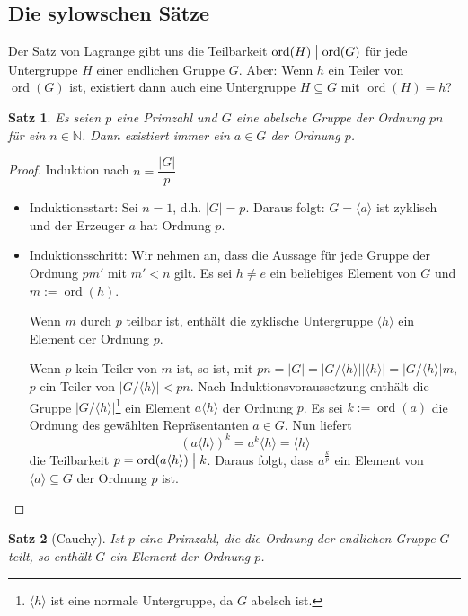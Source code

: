 \documentclass[12pt]{scrartcl} %
\DeclareMathOperator{\ord}{ord}
\newcommand{\divides}{\mathrel{\bigm|}}
\newtheorem{thm}{Satz}[section]
\theoremstyle{definition}
\theoremstyle{remark}
\begin{document}
\subsection{Die sylowschen Sätze}

Der Satz von Lagrange gibt uns die Teilbarkeit $\ord(H) \divides \ord(G)$ für jede Untergruppe $H$ einer endlichen Gruppe $G$.
Aber: Wenn \(h\) ein Teiler von $\ord(G)$ ist, existiert dann auch eine Untergruppe \(H \subseteq G\) mit $\ord(H)=h$?

\begin{thm}
	Es seien $p$ eine Primzahl und $G$ eine abelsche Gruppe der Ordnung $pn$ für ein $n\in\mathbb{N}$.
	Dann existiert immer ein $a \in G$ der Ordnung $p$.
\end{thm}

\begin{proof}
	Induktion nach $n=\dfrac{|G|}{p}$
	\begin{itemize}
	\item Induktionsstart: Sei \(n=1\), d.h. $|G|=p$.
		Daraus folgt: $G=\langle a\rangle$ ist zyklisch und der Erzeuger \(a\) hat Ordnung \(p\).
	\item Induktionsschritt: Wir nehmen an, dass die Aussage für jede Gruppe der Ordnung $pm'$ mit $m'<n$ gilt.
		Es sei $h\neq e$ ein beliebiges Element von \(G\) und $m:=\ord(h)$.

		Wenn \(m\) durch \(p\) teilbar ist, enthält die zyklische Untergruppe $\langle h\rangle$ ein Element der Ordnung \(p\).

		Wenn \(p\) kein Teiler von \(m\) ist, so ist, mit \(pn = |G| = |G/\langle h\rangle||\langle h\rangle| = |G/\langle h\rangle|m\), \(p\) ein Teiler von $|G/\langle h\rangle|<pn$.
		Nach Induktionsvoraussetzung enthält die Gruppe $|G/\langle h\rangle|$\footnote{\(\langle h\rangle\) ist eine normale Untergruppe, da \(G\) abelsch ist.} ein Element $a\langle h\rangle$ der Ordnung \(p\).
		Es sei $k:=\ord(a)$ die Ordnung des gewählten Repräsentanten $a \in G$.
		Nun liefert \[(a\langle h\rangle)^k=a^k\langle h\rangle=\langle h\rangle\] die Teilbarkeit \(p = \ord(a\langle h\rangle) \divides k\).
		Daraus folgt, dass $a^{\frac{k}{p}}$ ein Element von $\langle a\rangle \subseteq G$ der Ordnung \(p\) ist.\qedhere
	\end{itemize}
\end{proof}

\begin{thm}[Cauchy]
	Ist \(p\) eine Primzahl, die die Ordnung der endlichen Gruppe \(G\) teilt, so enthält \(G\) ein Element der Ordnung \(p\).
\end{thm}
\end{document}

